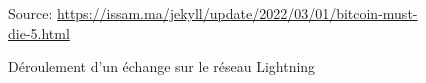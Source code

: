 \begin{figure}[h!]
    \centering
    {\scriptsize Source: \url{https://issam.ma/jekyll/update/2022/03/01/bitcoin-must-die-5.html}}
    \caption{Déroulement d'un échange sur le réseau Lightning}
    \label{fig:lightningNetwork}
\end{figure}

